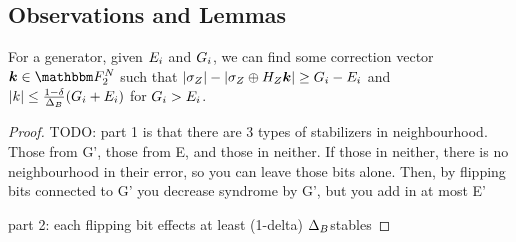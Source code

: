 \subsection*{Observations and Lemmas}

\begin{lemma}{For a generator, given ${E_i}$ and ${G_i}$,
	we can find some correction vector $\correctionvec \in \F_2^\NQubits$
	such that \linebreak $|\sigma_Z| - |\sigma_Z \oplus H_Z\boldsymbol{\boldsymbol{k}}| \geq {G_i} - {E_i}$}
	and $|k| \leq \frac{1-\delta}{{\Delta_{B}}} ({G_i} + {E_i})$ for ${G_i} > {E_i}$.
\label{lemma:decrby}
	\begin{proof}
		TODO:	 part 1 is that there are 3 types of stabilizers in neighbourhood.
		Those from G', those from E, and those in neither. If those in neither, there is no
		neighbourhood in their error, so you can leave those bits alone. Then, by flipping bits
		connected to G' you decrease syndrome by G', but you add in at most E'
		
		part 2: each flipping bit effects at least (1-delta) ${\Delta_{B}}$stables
	\end{proof}
\end{lemma}

